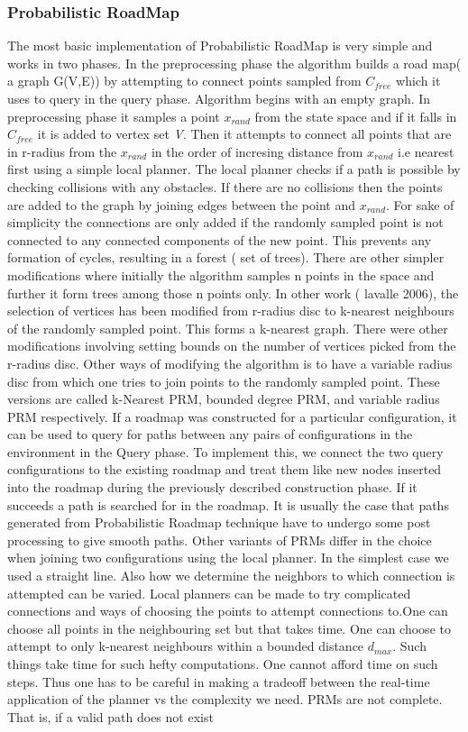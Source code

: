 \documentclass[MTech]{iitmdiss}
\begin{document}
\subsubsection{Probabilistic RoadMap}
The most basic implementation of Probabilistic RoadMap is very simple and works in two phases. In the preprocessing phase the algorithm builds a road map( a graph G(V,E))  by attempting to connect points sampled from $C_{free} $  which it uses to query in the query phase. Algorithm begins with an empty graph. In preprocessing phase it samples a point $x_{rand}$ from the state space and if it falls in $C_{free}$ it is added to vertex set \emph{V}. Then it attempts to connect all points that are in r-radius from the $x_{rand}$ in the order of incresing distance from $x_{rand}$ i.e nearest first using a simple local planner. The local planner checks if a path is possible by checking collisions with any obstacles. If there are no collisions then the points are added to the graph by joining edges between the point and $x_{rand}$. For sake of simplicity the connections are only added if the randomly sampled point is not connected to any connected components of the new point. This prevents any formation of cycles, resulting in a forest ( set of trees). There are other simpler modifications where initially the algorithm samples n points in the space and further it form trees among those n points only. In other work ( lavalle 2006), the selection of vertices has been modified from r-radius disc to k-nearest neighbours of the randomly sampled point. This forms a k-nearest graph. There were other modifications involving setting bounds on the number of vertices picked from the r-radius disc. Other ways of modifying the algorithm is to have a variable radius disc from which one tries to join points to the randomly sampled point. These versions are called k-Nearest PRM, bounded degree PRM, and variable radius PRM respectively. If a roadmap was constructed for a particular configuration, it can be used to query for paths between any pairs of configurations in the environment in the Query phase. To implement this, we connect the two query configurations to the existing roadmap and treat them like new nodes inserted into the roadmap during the previously described construction phase. If it succeeds a path is searched for in the roadmap. It is usually the case that paths generated from Probabilistic Roadmap technique have to undergo some post processing to give smooth paths. Other variants of PRMs differ in the choice when joining two configurations using the local planner. In the simplest case we used a straight line. Also how we determine the neighbors to which connection is attempted can be varied. Local planners can be made to try complicated connections and ways of choosing the points to attempt connections to.One can choose all points in the neighbouring set but that takes time. One can choose to attempt to only k-nearest neighbours within a bounded distance $d_{max}$. Such things take time for such hefty computations. One cannot afford time on such steps. Thus one has to be careful in making a tradeoff between the real-time application of the planner vs the complexity we need. PRMs are not complete. That is, if a valid path does not exist 
\end{document}
